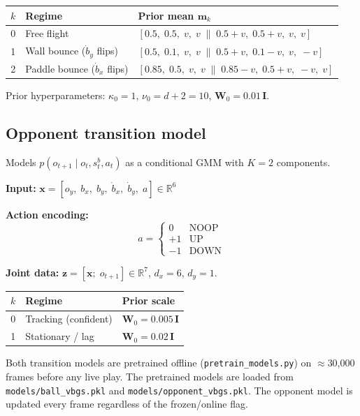 \documentclass[12pt, a4paper]{article}
\newcommand{\R}{\mathbb{R}}
\newcommand{\1}{\mathbf{1}}
\newcommand{\code}[1]{\texttt{#1}}
\begin{document}
\begin{table}[ht]
\centering
\begin{tabular}{cll}
\toprule
$k$ & Regime & Prior mean $\mathbf{m}_k$ \\
\midrule
0 & Free flight &
  $[0.5,\;0.5,\;v,\;v \;\|\; 0.5{+}v,\;0.5{+}v,\;v,\;v]$ \\
1 & Wall bounce ($\dot b_y$ flips) &
  $[0.5,\;0.1,\;v,\;v \;\|\; 0.5{+}v,\;0.1{-}v,\;v,\;{-}v]$ \\
2 & Paddle bounce ($\dot b_x$ flips) &
  $[0.85,\;0.5,\;v,\;v \;\|\; 0.85{-}v,\;0.5{+}v,\;{-}v,\;v]$ \\
\bottomrule
\end{tabular}
\end{table}

Prior hyperparameters: $\kappa_0 = 1$, $\nu_0 = d + 2 = 10$,
$\mathbf{W}_0 = 0.01\,\mathbf{I}$.

\subsection{Opponent transition model}

Models $p(o_{t+1} \mid o_t, s^b_t, a_t)$ as a conditional GMM with $K=2$
components.

\textbf{Input:}
$\mathbf{x} = [o_y,\; b_x,\; b_y,\; \dot b_x,\; \dot b_y,\; a] \in \R^6$

\textbf{Action encoding:}
\[
a = \begin{cases} 0 & \text{NOOP} \\ +1 & \text{UP} \\ -1 & \text{DOWN} \end{cases}
\]

\textbf{Joint data:} $\mathbf{z} = [\mathbf{x};\; o_{t+1}] \in \R^7$,
$d_x = 6$, $d_y = 1$.

\begin{table}[ht]
\centering
\begin{tabular}{cll}
\toprule
$k$ & Regime & Prior scale \\
\midrule
0 & Tracking (confident) & $\mathbf{W}_0 = 0.005\,\mathbf{I}$ \\
1 & Stationary / lag     & $\mathbf{W}_0 = 0.02\,\mathbf{I}$ \\
\bottomrule
\end{tabular}
\end{table}

Both transition models are pretrained offline (\code{pretrain\_models.py}) on
$\approx$30,000 frames before any live play.  The pretrained models are loaded
from \code{models/ball\_vbgs.pkl} and \code{models/opponent\_vbgs.pkl}.  The
opponent model is updated every frame regardless of the frozen/online flag.
\end{document}
